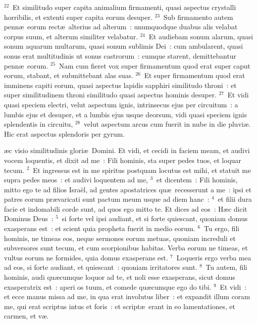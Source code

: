 ${}^{22}$~Et similitudo super capita animalium firmamenti, quasi aspectus crystalli horribilis, et extenti super capita eorum desuper.
${}^{23}$~Sub firmamento autem penn\ae\ eorum rect\ae\ alterius ad alterum~: unumquodque duabus alis velabat corpus suum, et alterum similiter velabatur.
${}^{24}$~Et audiebam sonum alarum, quasi sonum aquarum multarum, quasi sonum sublimis Dei~: cum ambularent, quasi sonus erat multitudinis ut sonus castrorum~: cumque starent, demittebantur penn\ae\ eorum.
${}^{25}$~Nam cum fieret vox super firmamentum quod erat super caput eorum, stabant, et submittebant alas suas.
${}^{26}$~Et super firmamentum quod erat imminens capiti eorum, quasi aspectus lapidis sapphiri similitudo throni~: et super similitudinem throni similitudo quasi aspectus hominis desuper.
${}^{27}$~Et vidi quasi speciem electri, velut aspectum ignis, intrinsecus ejus per circuitum~: a lumbis ejus et desuper, et a lumbis ejus usque deorsum, vidi quasi speciem ignis splendentis in circuitu,
${}^{28}$~velut aspectum arcus cum fuerit in nube in die pluvi\ae . Hic erat aspectus splendoris per gyrum.

\bchapter
{}\ae c visio similitudinis glori\ae\ Domini. Et vidi, et cecidi in faciem meam, et audivi vocem loquentis, et dixit ad me~: Fili hominis, sta super pedes tuos, et loquar tecum.
${}^{2}$~Et ingressus est in me spiritus postquam locutus est mihi, et statuit me supra pedes meos~: et audivi loquentem ad me,
${}^{3}$~et dicentem~: Fili hominis, mitto ego te ad filios Isra\"el, ad gentes apostatrices qu\ae\ recesserunt a me~: ipsi et patres eorum pr\ae varicati sunt pactum meum usque ad diem hanc~:
${}^{4}$~et filii dura facie et indomabili corde sunt, ad quos ego mitto te. Et dices ad eos~: H\ae c dicit Dominus Deus~:
${}^{5}$~si forte vel ipsi audiant, et si forte quiescant, quoniam domus exasperans est~: et scient quia propheta fuerit in medio eorum.
${}^{6}$~Tu ergo, fili hominis, ne timeas eos, neque sermones eorum metuas, quoniam increduli et subversores sunt tecum, et cum scorpionibus habitas. Verba eorum ne timeas, et vultus eorum ne formides, quia domus exasperans est.
${}^{7}$~Loqueris ergo verba mea ad eos, si forte audiant, et quiescant~: quoniam irritatores sunt.
${}^{8}$~Tu autem, fili hominis, audi qu\ae cumque loquor ad te, et noli esse exasperans, sicut domus exasperatrix est~: aperi os tuum, et comede qu\ae cumque ego do tibi.
${}^{9}$~Et vidi~: et ecce manus missa ad me, in qua erat involutus liber~: et expandit illum coram me, qui erat scriptus intus et foris~: et script\ae\ erant in eo lamentationes, et carmen, et v\ae .

